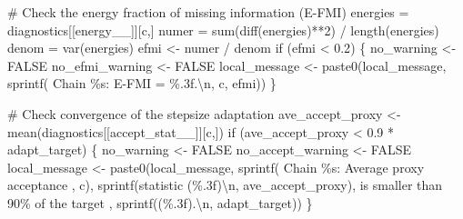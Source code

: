 \documentclass[
  letterpaper,
  DIV=11,
  numbers=noendperiod]{scrartcl}
\newenvironment{Shaded}{\begin{snugshade}}{\end{snugshade}}
\newcommand{\BuiltInTok}[1]{\textcolor[rgb]{0.00,0.23,0.31}{#1}}
\newcommand{\CharTok}[1]{\textcolor[rgb]{0.13,0.47,0.30}{#1}}
\newcommand{\CommentTok}[1]{\textcolor[rgb]{0.37,0.37,0.37}{#1}}
\newcommand{\ControlFlowTok}[1]{\textcolor[rgb]{0.00,0.23,0.31}{#1}}
\newcommand{\DecValTok}[1]{\textcolor[rgb]{0.68,0.00,0.00}{#1}}
\newcommand{\FloatTok}[1]{\textcolor[rgb]{0.68,0.00,0.00}{#1}}
\newcommand{\NormalTok}[1]{\textcolor[rgb]{0.00,0.23,0.31}{#1}}
\newcommand{\OperatorTok}[1]{\textcolor[rgb]{0.37,0.37,0.37}{#1}}
\newcommand{\SpecialCharTok}[1]{\textcolor[rgb]{0.37,0.37,0.37}{#1}}
\newcommand{\StringTok}[1]{\textcolor[rgb]{0.13,0.47,0.30}{#1}}
\begin{document}
\begin{Shaded}
\begin{Highlighting}[]
    \CommentTok{\# Check the energy fraction of missing information (E{-}FMI)}
\NormalTok{    energies }\OperatorTok{=}\NormalTok{ diagnostics[[}\StringTok{\textquotesingle{}energy\_\_\textquotesingle{}}\NormalTok{]][c,]}
\NormalTok{    numer }\OperatorTok{=} \BuiltInTok{sum}\NormalTok{(diff(energies)}\OperatorTok{**}\DecValTok{2}\NormalTok{) }\OperatorTok{/}\NormalTok{ length(energies)}
\NormalTok{    denom }\OperatorTok{=}\NormalTok{ var(energies)}
\NormalTok{    efmi }\OperatorTok{\textless{}{-}}\NormalTok{ numer }\OperatorTok{/}\NormalTok{ denom}
    \ControlFlowTok{if}\NormalTok{ (efmi }\OperatorTok{\textless{}} \FloatTok{0.2}\NormalTok{) \{}
\NormalTok{      no\_warning }\OperatorTok{\textless{}{-}}\NormalTok{ FALSE}
\NormalTok{      no\_efmi\_warning }\OperatorTok{\textless{}{-}}\NormalTok{ FALSE}
\NormalTok{      local\_message }\OperatorTok{\textless{}{-}} 
\NormalTok{        paste0(local\_message, }
\NormalTok{               sprintf(}\StringTok{\textquotesingle{}  Chain }\SpecialCharTok{\%s}\StringTok{: E{-}FMI = }\SpecialCharTok{\%.3f}\StringTok{.}\CharTok{\textbackslash{}n}\StringTok{\textquotesingle{}}\NormalTok{, c, efmi))}
\NormalTok{    \}}
    
    \CommentTok{\# Check convergence of the stepsize adaptation}
\NormalTok{    ave\_accept\_proxy }\OperatorTok{\textless{}{-}}\NormalTok{ mean(diagnostics[[}\StringTok{\textquotesingle{}accept\_stat\_\_\textquotesingle{}}\NormalTok{]][c,])}
    \ControlFlowTok{if}\NormalTok{ (ave\_accept\_proxy }\OperatorTok{\textless{}} \FloatTok{0.9} \OperatorTok{*}\NormalTok{ adapt\_target) \{}
\NormalTok{      no\_warning }\OperatorTok{\textless{}{-}}\NormalTok{ FALSE}
\NormalTok{      no\_accept\_warning }\OperatorTok{\textless{}{-}}\NormalTok{ FALSE}
\NormalTok{      local\_message }\OperatorTok{\textless{}{-}} 
\NormalTok{        paste0(local\_message,}
\NormalTok{               sprintf(}\StringTok{\textquotesingle{}  Chain }\SpecialCharTok{\%s}\StringTok{: Average proxy acceptance \textquotesingle{}}\NormalTok{, c),}
\NormalTok{               sprintf(}\StringTok{\textquotesingle{}statistic (}\SpecialCharTok{\%.3f}\StringTok{)}\CharTok{\textbackslash{}n}\StringTok{\textquotesingle{}}\NormalTok{, ave\_accept\_proxy),}
                       \StringTok{\textquotesingle{}           is smaller than 90}\SpecialCharTok{\% o}\StringTok{f the target \textquotesingle{}}\NormalTok{,}
\NormalTok{               sprintf(}\StringTok{\textquotesingle{}(}\SpecialCharTok{\%.3f}\StringTok{).}\CharTok{\textbackslash{}n}\StringTok{\textquotesingle{}}\NormalTok{, adapt\_target))}
\NormalTok{    \}}
    

\end{Highlighting}
\end{Shaded}
\end{document}
